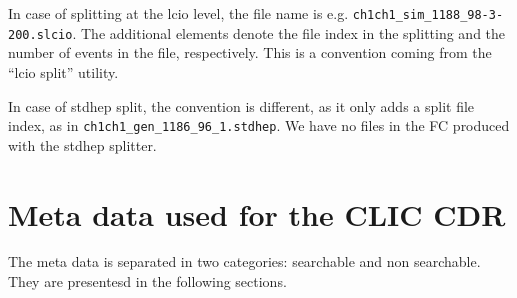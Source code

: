 \documentclass[11pt,a4paper]{scrartcl}
\begin{document}
In case of splitting at the lcio level, the file name is e.g.
\lstinline[language=bash]|ch1ch1_sim_1188_98-3-200.slcio|. The additional
elements denote the file index in the splitting and the number of events in the
file, respectively. This is a convention coming from the ``lcio split'' utility. 

In case of stdhep split, the convention is different, as it only adds a split
file index, as in \lstinline[language=bash]|ch1ch1_gen_1186_96_1.stdhep|. We
have no files in the FC produced with the stdhep splitter. 

\section{Meta data used for the CLIC CDR}
The meta data is separated in two categories: searchable and non searchable.
They are presentesd in the following sections.
\end{document}
